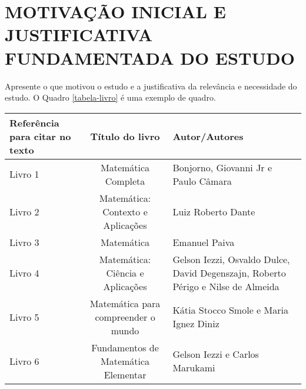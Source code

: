 \chapter{MOTIVAÇÃO INICIAL E JUSTIFICATIVA FUNDAMENTADA DO ESTUDO}
\label{cap1}
\thispagestyle{empty}

Apresente o que motivou o estudo e a justificativa da relevância e necessidade do estudo. O Quadro \ref{tabela-livro} é uma exemplo de quadro.

  \begin{tabular}{|p{3cm}||c||p{4cm}|}
      \hline
      \textbf{Referência para citar no texto}    & \textbf {Título do livro} & \textbf {Autor/Autores} \\
  \hline
  \hline
  \label{livro 1}Livro 1 & Matemática Completa&Bonjorno, Giovanni Jr e Paulo Câmara \\ 
  \hline
 \label{livro 2}Livro 2 & Matemática: Contexto e Aplicações & Luiz Roberto Dante\\ 
 \hline
 \label{livro 3}Livro 3 & Matemática & Emanuel Paiva \\ 
 \hline
  \label{livro 4}Livro 4 & Matemática: Ciência e Aplicações  &Gelson Iezzi, Osvaldo Dulce, David Degenszajn, Roberto Périgo e Nilse de Almeida \\ 
  \hline
  \label{livro 5}Livro 5 & Matemática para compreender o mundo & Kátia Stocco Smole e Maria Ignez Diniz \\ 
 
 \hline
  \label{livro 6}Livro 6 & Fundamentos de Matemática Elementar & Gelson Iezzi e Carlos Marukami \\ 
 \hline

 \end{tabular}
\vspace{0.5cm}

